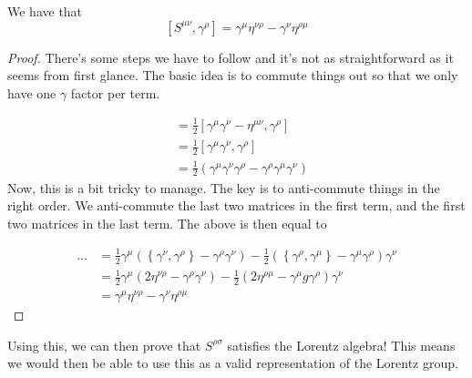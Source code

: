 \begin{claim}
We have that 
	\[
		[ S ^{ \mu \nu } , \gamma ^ \rho ]  = \gamma ^ \mu \eta ^{ \nu \rho } 
		  - \gamma ^ \nu \eta ^{ \rho \mu }
	\]  
\begin{proof}
There's some steps we have to follow and it's not as straightforward 
as it seems from first glance. 
The basic idea is to commute things out 
so that we only have one $ \gamma $ factor per term. 

\begin{align*}
	[S ^{ \mu \nu } , \gamma ^{ \rho } ] &=  
	\frac{1}{2 } [ \gamma ^ \mu \gamma ^ \nu  - \eta ^{ \mu \nu } , \gamma ^{ \rho }  ] \\
					     &=  \frac{1}{2 } [ \gamma ^ \mu \gamma ^ \nu , \gamma ^ \rho ]  \\
					     &=  \frac{1}{2  } ( \gamma^ \mu \gamma ^ \nu \gamma ^ \rho - 
					     \gamma ^ \rho \gamma ^ \mu \gamma ^ \nu ) 
\end{align*}
Now, this is a bit tricky to manage. The key is to anti-commute things 
in the right order. We anti-commute the last two 
matrices in the first term, and the first two matrices in 
the last term. 
The above is then equal to 

\begin{align*}
	\dots & = \frac{1}{2} \gamma ^ \mu ( \left\{  \gamma ^ \nu , \gamma ^ \rho  \right\}   - \gamma ^ \rho \gamma ^ \nu )
	 - \frac{1}{2 }\left(  \left\{  \gamma ^ \rho , \gamma ^ \mu  \right\}  - \gamma ^ \mu \gamma ^ \rho  \right)  \gamma ^ \nu \\
	      &=  \frac{1}{2 } \gamma ^ \mu \left(  
	      2 \eta ^{ \nu  \rho }  - \gamma ^ \rho \gamma ^ \nu \right)   - \frac{1}{2 } 
	      ( 2 \eta ^{ \rho \mu } - \gamma ^ \mu g \gamma ^ \rho ) \gamma ^ \nu \\
	      &=  \gamma ^ \mu \eta ^{ \nu \rho } - 
	      \gamma ^ \nu \eta ^{ \rho \mu }
\end{align*}
\end{proof} 
\end{claim}
Using this, we can then prove that $ S^{ \rho \sigma} $
satisfies the Lorentz algebra! This means we 
would then be able to use this 
as a valid representation of the Lorentz group. 
